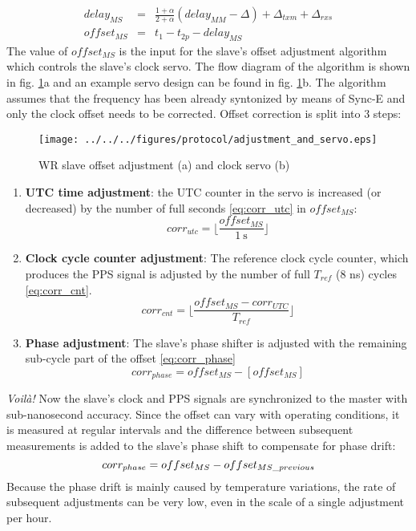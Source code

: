 \begin{eqnarray}
\label{eq:delaymm_full_3}delay_{MS} & = & \frac{1+\alpha}{2+\alpha} (delay_{MM}
- \Delta) + \Delta_{txm} + \Delta_{rxs} \\
\label{eq:offset_ms} offset_{MS} & = & t_{1} - t_{2p} - delay_{MS}
\end{eqnarray}
The value of $offset_{MS}$ is the input for the slave's offset adjustment
algorithm which controls the slave's clock servo. The flow diagram of the
algorithm is shown in fig. \ref{fig:adjustment_and_servo}a and an example
servo design can be found in fig. \ref{fig:adjustment_and_servo}b. The
algorithm assumes that the frequency has been already syntonized by means
of Sync-E and only the clock offset needs to be corrected. Offset correction
is split into 3 steps:
\begin{figure}[ht!]
  \centering
  \texttt{[image: ../../../figures/protocol/adjustment\_and\_servo.eps]}
  \caption{WR slave offset adjustment (a) and clock servo (b)}
  \label{fig:adjustment_and_servo}
\end{figure}
\begin{enumerate}
\item \textbf{UTC time adjustment}: the UTC counter in the servo is
increased (or decreased) by the number of full seconds \ref{eq:corr_utc}
in $offset_{MS}$:
\begin{equation}
corr_{utc} = \lfloor{\frac{offset_{MS}}{1 \mathrm{~s}}}\rfloor
\label{eq:corr_utc}
\end{equation}
\item \textbf{Clock cycle counter adjustment}: The reference clock cycle
counter, which produces the PPS signal is adjusted by the number of full
$T_{ref}$ (8 ns) cycles \ref{eq:corr_cnt}.
\begin{equation}
corr_{cnt} = \lfloor \frac{offset_{MS} - corr_{UTC}}{T_{ref}}\rfloor
\label{eq:corr_cnt}
\end{equation}
\item \textbf{Phase adjustment}: The slave's phase shifter is adjusted with
the remaining sub-cycle part of the offset \ref{eq:corr_phase}
\begin{equation}
corr_{phase} = offset_{MS} - [offset_{MS}]
\label{eq:corr_phase}
\end{equation}
\end{enumerate}
\emph{Voil\`{a}!} Now the slave's clock and PPS signals are synchronized to the
master with sub-nanosecond accuracy. Since the offset can vary with operating
conditions, it is measured at regular intervals and the difference between
subsequent measurements is added to the slave's phase shift to compensate for
phase drift:
\begin{equation}
corr_{phase} = offset_{MS} - offset_{MS\us previous}
\label{eq:corr_phase2}
\end{equation}
Because the phase drift is mainly caused by temperature variations, the rate
of subsequent adjustments can be very low, even in the scale of a single
adjustment per hour.

